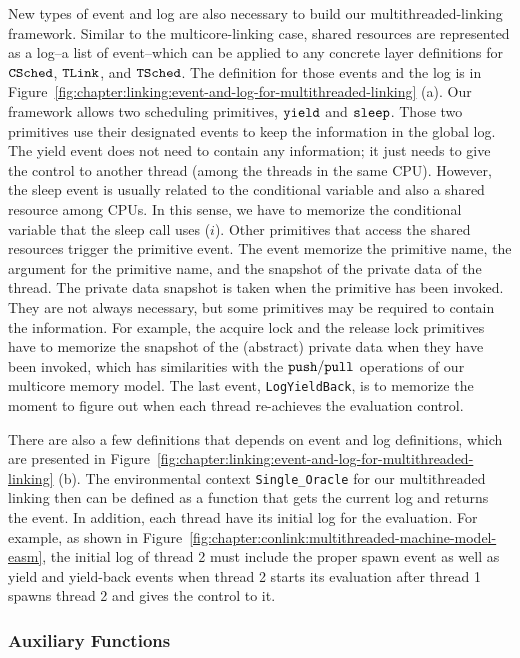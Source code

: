 New types of event and log are also necessary to build our multithreaded-linking framework. 
Similar to the multicore-linking case, 
shared resources are represented as a log--a list of event--which can be applied to any concrete layer definitions for 
${{\mathrm{\texttt{CSched}}}}$, ${{\mathrm{\texttt{TLink}}}}$, and ${{\mathrm{\texttt{TSched}}}}$.
The definition for those events and the log is in Figure~\ref{fig:chapter:linking:event-and-log-for-multithreaded-linking} (a).
Our framework allows two scheduling primitives, 
${\mathrm{\texttt{yield}}}$ and ${\mathrm{\texttt{sleep}}}$. 
Those two primitives use their designated events to keep the information in the global log. 
The yield event does not need to contain any information; it just needs to give the control
to another thread (among the threads in the same CPU). 
However, the sleep event is usually related to the conditional variable and also a shared resource among CPUs.
In this sense, we have to memorize the conditional variable that the sleep call uses ($i$).
Other primitives that access the shared resources trigger the primitive event. 
The event memorize the primitive name, the argument for the primitive name,
and the snapshot of the private data of the thread.
The private data snapshot is taken  when the primitive has been invoked. 
They are not always necessary, but some primitives may be required to contain the information.
For example, the acquire lock and the release lock primitives have to memorize the snapshot of the (abstract) private data when they have been invoked, which has similarities with the ${\mathrm{\texttt{push}}}/{\mathrm{\texttt{pull}}}$ operations of our multicore memory model. 
The last event, \lstinline$LogYieldBack$, is to memorize the moment to figure out when each thread re-achieves the evaluation control. 

There are also a few definitions that depends on event and log definitions, which are presented in Figure~\ref{fig:chapter:linking:event-and-log-for-multithreaded-linking} (b).
The environmental context \lstinline$Single_Oracle$  for our multithreaded linking
then can be defined as a function that gets the current log and returns the event. 
In addition,
each thread have its initial log for the evaluation. 
For example, as shown in Figure~\ref{fig:chapter:conlink:multithreaded-machine-model-easm},
the initial log of thread 2 must include the proper spawn event as well as yield and yield-back events
when thread 2 starts its evaluation after thread 1 spawns  thread 2 and gives the control to it.

\subsubsection{Auxiliary Functions}

